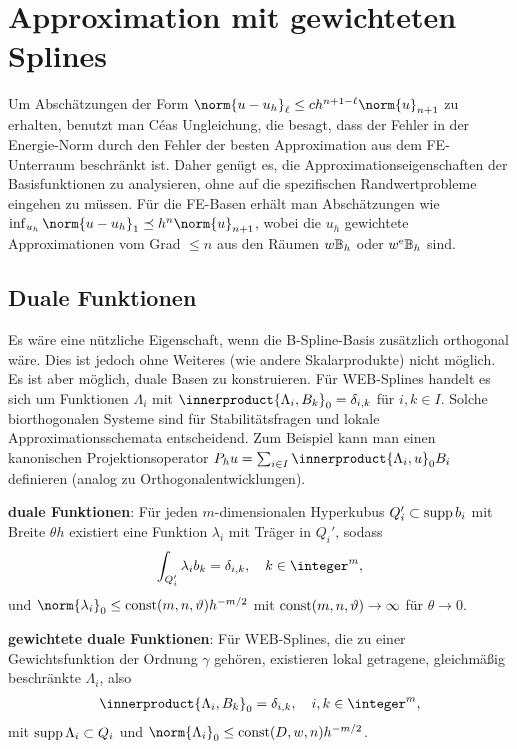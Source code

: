 \chapter{%
    Approximation mit gewichteten Splines%
}

Um Abschätzungen der Form $\norm{u - u_h}_\ell \le c h^{n+1-\ell} \norm{u}_{n+1}$ zu erhalten,
benutzt man Céas Ungleichung, die besagt, dass der Fehler in der Energie-Norm
durch den Fehler der besten Approximation aus dem FE-Unterraum beschränkt ist.
Daher genügt es, die Approximationseigenschaften der Basisfunktionen zu analysieren,
ohne auf die spezifischen Randwertprobleme eingehen zu müssen.
Für die FE-Basen erhält man Abschätzungen wie
$\inf_{u_h} \norm{u - u_h}_1 \preceq h^n \norm{u}_{n+1}$,
wobei die $u_h$ gewichtete Approximationen vom Grad $\le n$
aus den Räumen $w\mathbb{B}_h$ oder $w^{\mathrm{e}}\mathbb{B}_h$ sind.

\section{%
    Duale Funktionen%
}

Es wäre eine nützliche Eigenschaft, wenn die B-Spline-Basis zusätzlich orthogonal wäre.
Dies ist jedoch ohne Weiteres (wie andere Skalarprodukte) nicht möglich.
Es ist aber möglich, duale Basen zu konstruieren.
Für WEB-Splines handelt es sich um Funktionen $\Lambda_i$ mit
$\innerproduct{\Lambda_i, B_k}_0 = \delta_{i,k}$ für $i, k \in I$.
Solche biorthogonalen Systeme sind für Stabilitätsfragen und lokale Approximationsschemata
entscheidend.
Zum Beispiel kann man einen kanonischen Projektionsoperator
$P_h u = \sum_{i \in I} \innerproduct{\Lambda_i, u}_0 B_i$ definieren
(analog zu Orthogonalentwicklungen).

\textbf{duale Funktionen}:
Für jeden $m$-dimensionalen Hyperkubus $Q_i' \subset \operatorname{supp} b_i$ mit Breite $\theta h$
existiert eine Funktion $\lambda_i$ mit Träger in $Q_i'$, sodass
\begin{align*}
    \int_{Q_i'} \lambda_i b_k = \delta_{i,k},\quad
    k \in \integer^m,
\end{align*}
und $\norm{\lambda_i}_0 \le \const(m, n, \theta) h^{-m/2}$
mit $\operatorname{const}(m, n, \vartheta) \to \infty$ für $\theta \to 0$.

\textbf{gewichtete duale Funktionen}:
Für WEB-Splines, die zu einer Gewichtsfunktion der Ordnung $\gamma$ gehören,
existieren lokal getragene, gleichmäßig beschränkte  $\Lambda_i$, also
\begin{align*}
    \innerproduct{\Lambda_i, B_k}_0 = \delta_{i,k},\quad
    i, k \in \integer^m,
\end{align*}
mit $\operatorname{supp} \Lambda_i \subset Q_i$ und
$\norm{\Lambda_i}_0 \le \const(D, w, n) h^{-m/2}$.

